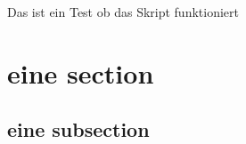 Das ist ein Test ob das Skript funktioniert


\section{eine section}

\blindtext 
\hline
\subsection{eine subsection}
\blindtext
\blindtext 
\blindtext
\blindtext 
\blindtext
\blindtext 
